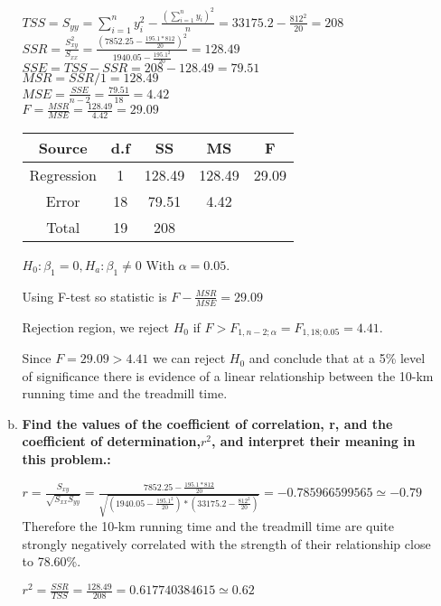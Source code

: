 \documentclass{article}
\begin{document}
\begin{enumerate}[1.]
\begin{enumerate}[(a)]
$TSS = S_{yy} = \sum_{i=1}^{n}{y_i^2} - \frac{ (\sum_{i=1}^{n}{y_i})^2 }{n} = 33175.2 - \frac{812^2}{20} = 208 $ \\
$SSR = \frac{S_{xy}^2}{S_{xx}} = \frac{ (7852.25 - \frac{195.1 * 812}{20})^2}{ 1940.05 - \frac{195.1^2}{20}} = 128.49 $ \\
$SSE = TSS - SSR = 208 - 128.49 = 79.51 $ \\ 
$MSR = SSR/1 = 128.49 $ \\ 
$MSE = \frac{SSE}{n-2} = \frac{79.51}{18} = 4.42$ \\
$F = \frac{MSR}{MSE} = \frac{128.49}{4.42} =  29.09 $ \\

\begin{center}
 \begin{tabular}{||c c c c c||} 
 \hline
Source & d.f & SS & MS & F \\ [0.5ex] 
 \hline\hline
Regression & 1 & 128.49 & 128.49 & 29.09 \\
 \hline
Error & 18 & 79.51 & 4.42 &  \\
 \hline
Total & 19  & 208 & & \\ [1ex]
 \hline
\end{tabular}
\end{center}

$H_0: \beta_1 = 0, H_a: \beta_1 \neq 0$
With $\alpha = 0.05$.

Using F-test so statistic is $F - \frac{MSR}{MSE} = 29.09$

Rejection region, we reject $H_0$ if $F > F_{1,n-2;\alpha} = F_{1,18;0.05} = 4.41$.

Since $F = 29.09 > 4.41$ we can reject $H_0$ and conclude that at a 5\% level of significance there is evidence of a linear relationship between the 10-km running time and the treadmill time. 

  \item \textbf{ Find the values of the coefficient of correlation, r, and the coefficient of determination,$r^2$, and interpret their meaning in this problem.: }

$r = \frac{S_{xy}}{\sqrt{S_{xx}S_{yy}}} = \frac{7852.25-\frac{195.1*812}{20}}{\sqrt{ (1940.05 - \frac{195.1^2}{20}) * (33175.2-\frac{812^2}{20})}} = -0.785966599565 \simeq -0.79$ \\

Therefore the 10-km running time and the treadmill time are quite strongly negatively correlated with the strength of their relationship close to 78.60\%.

$r^2 = \frac{SSR}{TSS} = \frac{128.49}{208} = 0.617740384615 \simeq 0.62$ \\


\end{enumerate}
\end{enumerate}
\end{document}
